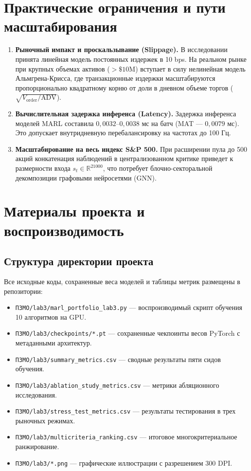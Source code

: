 \documentclass[11pt,a4paper]{article}
\begin{document}
\section{Практические ограничения и пути масштабирования}

\begin{enumerate}[leftmargin=*]
\item \textbf{Рыночный импакт и проскальзывание (Slippage).} В исследовании принята линейная модель постоянных издержек в 10 bps. На реальном рынке при крупных объемах активов ($> \$10\text{M}$) вступает в силу нелинейная модель Альмгрена-Крисса, где транзакционные издержки масштабируются пропорционально квадратному корню от доли в дневном объеме торгов ($\sqrt{V_{\text{order}} / \text{ADV}}$).
\item \textbf{Вычислительная задержка инференса (Latency).} Задержка инференса моделей MARL составила $0{,}0032$--$0{,}0038$ мс на батч (MAT --- $0{,}0079$ мс). Это допускает внутридневную перебалансировку на частотах до 100 Гц.
\item \textbf{Масштабирование на весь индекс S\&P 500.} При расширении пула до 500 акций конкатенация наблюдений в централизованном критике приведет к размерности входа $s_t \in \mathbb{R}^{21000}$, что потребует блочно-секторальной декомпозиции графовыми нейросетями (GNN).
\end{enumerate}

\section{Материалы проекта и воспроизводимость}

\subsection{Структура директории проекта}

Все исходные коды, сохраненные веса моделей и таблицы метрик размещены в репозитории:
\begin{itemize}[leftmargin=*]
\item \texttt{ПЗМО/lab3/marl\_portfolio\_lab3.py} --- воспроизводимый скрипт обучения 10 алгоритмов на GPU.
\item \texttt{ПЗМО/lab3/checkpoints/*.pt} --- сохраненные чекпоинты весов PyTorch с метаданными архитектур.
\item \texttt{ПЗМО/lab3/summary\_metrics.csv} --- сводные результаты пяти сидов обучения.
\item \texttt{ПЗМО/lab3/ablation\_study\_metrics.csv} --- метрики абляционного исследования.
\item \texttt{ПЗМО/lab3/stress\_test\_metrics.csv} --- результаты тестирования в трех рыночных режимах.
\item \texttt{ПЗМО/lab3/multicriteria\_ranking.csv} --- итоговое многокритериальное ранжирование.
\item \texttt{ПЗМО/lab3/*.png} --- графические иллюстрации с разрешением 300 DPI.
\end{itemize}
\end{document}
